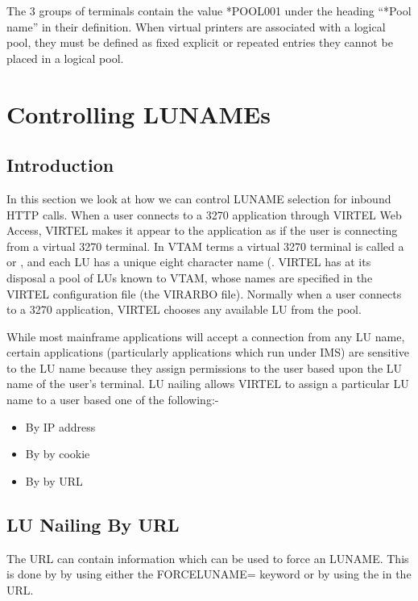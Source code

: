 \documentclass[letterpaper,10pt,english]{sphinxmanual}
\begin{document}
The 3 groups of terminals contain the value *POOL001 under the heading “*Pool name” in their definition. When virtual printers are associated with a logical pool, they must be defined as fixed explicit or repeated entries \textendash{} they cannot be placed in a logical pool.


\chapter{Controlling LUNAMEs}
\label{\detokenize{connectivity_guide:controlling-lunames}}\label{\detokenize{connectivity_guide:v457cn-forceluname}}\label{\detokenize{connectivity_guide:index-149}}

\section{Introduction}
\label{\detokenize{connectivity_guide:id72}}
In this section we look at how we can control LUNAME selection for inbound HTTP calls. When a user connects to a 3270 application through VIRTEL Web Access, VIRTEL makes it appear to the application as if the user is connecting from a virtual 3270 terminal. In VTAM terms a virtual 3270 terminal is called a  or , and each LU has a unique eight character name (. VIRTEL has at its disposal a pool of LUs known to VTAM, whose names are specified in the VIRTEL configuration file (the VIRARBO file). Normally when a user connects to a 3270 application, VIRTEL chooses any available LU from the pool.

While most mainframe applications will accept a connection from any LU name, certain applications (particularly applications which run under IMS) are sensitive to the LU name because they assign permissions to the user based upon the LU name of the user’s terminal. LU nailing allows VIRTEL to assign a particular LU name to a user based one of the following:-
\begin{itemize}
\item {} 
By IP address

\item {} 
By by cookie

\item {} 
By by URL

\end{itemize}


\section{LU Nailing By URL}
\label{\detokenize{connectivity_guide:lu-nailing-by-url}}
The URL can contain information which can be used to force an LUNAME. This is done by by using either the FORCELUNAME= keyword or by using the  in the URL.
\end{document}
